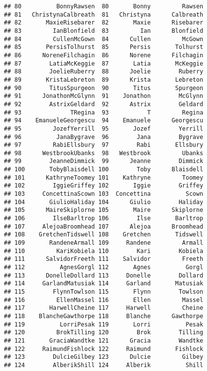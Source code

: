 \documentclass[]{article}
\begin{document}
\begin{verbatim}
## 80          BonnyRawsen  80       Bonny         Rawsen
## 81   ChristynaCalbreath  81   Christyna      Calbreath
## 82       MaxieRisebarer  82       Maxie      Risebarer
## 83         IanBlonfield  83         Ian      Blonfield
## 84         CullenMcGown  84      Cullen         McGown
## 85       PersisTolhurst  85      Persis       Tolhurst
## 86      NoreneFilchagin  86      Norene      Filchagin
## 87        LatiaMcKeggie  87       Latia       McKeggie
## 88        JoelieRuberry  88      Joelie        Ruberry
## 89       KristaLebreton  89      Krista       Lebreton
## 90        TitusSpurgeon  90       Titus       Spurgeon
## 91      JonathonMcGlynn  91    Jonathon        McGlynn
## 92        AstrixGeldard  92      Astrix        Geldard
## 93              TRegina  93           T         Regina
## 94    EmanueleGeorgescu  94    Emanuele      Georgescu
## 95         JozefYerrill  95       Jozef        Yerrill
## 96          JanaBygrave  96        Jana        Bygrave
## 97         RabiEllsbury  97        Rabi       Ellsbury
## 98      WestbrookUbanks  98   Westbrook         Ubanks
## 99        JeanneDimmick  99      Jeanne        Dimmick
## 100       TobyBlaisdell 100        Toby      Blaisdell
## 101      KathryneToomey 101    Kathryne         Toomey
## 102        IggieGriffey 102       Iggie        Griffey
## 103     ConcettinaScown 103  Concettina          Scown
## 104       GiulioHaliday 104      Giulio        Haliday
## 105      MaireSkiplorne 105       Maire      Skiplorne
## 106        IlseBarltrop 106        Ilse       Barltrop
## 107     AlejoaBroomhead 107      Alejoa      Broomhead
## 108    GretchenTidswell 108    Gretchen       Tidswell
## 109       RandeneArmall 109     Randene         Armall
## 110         KariKobiela 110        Kari        Kobiela
## 111      SalvidorFreeth 111    Salvidor         Freeth
## 112          AgnesGorgl 112       Agnes          Gorgl
## 113      DonelleDollard 113     Donelle        Dollard
## 114     GarlandMatusiak 114     Garland       Matusiak
## 115        FlynnTowlson 115       Flynn        Towlson
## 116         EllenMassel 116       Ellen         Massel
## 117       HarwellCheine 117     Harwell         Cheine
## 118    BlancheGawthorpe 118     Blanche      Gawthorpe
## 119          LorriPesak 119       Lorri          Pesak
## 120         BrokTilling 120        Brok        Tilling
## 121       GraciaWandtke 121      Gracia        Wandtke
## 122     RaimundFishlock 122     Raimund       Fishlock
## 123        DulcieGilbey 123      Dulcie         Gilbey
## 124        AlberikShill 124     Alberik          Shill

\end{verbatim}
\end{document}
